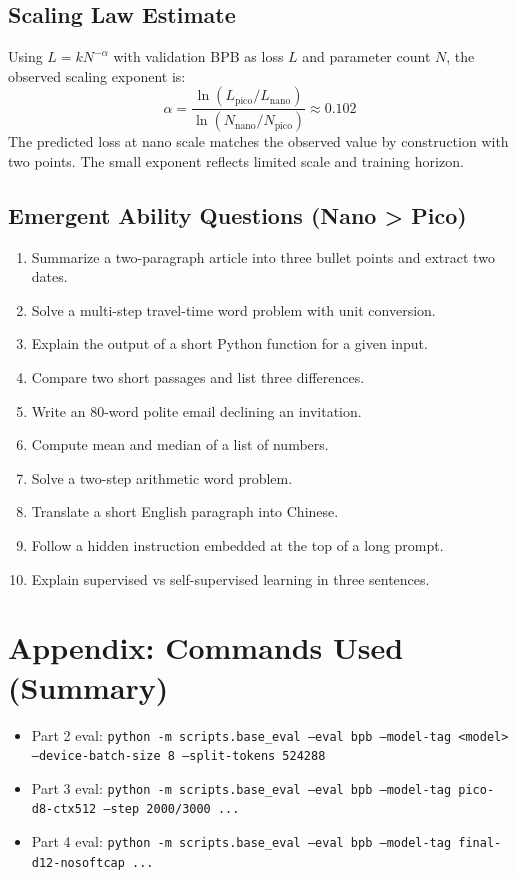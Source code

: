 \documentclass[11pt]{article}
\begin{document}
\subsection*{Scaling Law Estimate}
Using $L = k N^{-\alpha}$ with validation BPB as loss $L$ and parameter count $N$, the observed scaling exponent is:
\[
\alpha = \frac{\ln(L_\text{pico} / L_\text{nano})}{\ln(N_\text{nano} / N_\text{pico})} \approx 0.102
\]
The predicted loss at nano scale matches the observed value by construction with two points. The small exponent reflects limited scale and training horizon.

\subsection*{Emergent Ability Questions (Nano > Pico)}
\begin{enumerate}
\item Summarize a two-paragraph article into three bullet points and extract two dates.
\item Solve a multi-step travel-time word problem with unit conversion.
\item Explain the output of a short Python function for a given input.
\item Compare two short passages and list three differences.
\item Write an 80-word polite email declining an invitation.
\item Compute mean and median of a list of numbers.
\item Solve a two-step arithmetic word problem.
\item Translate a short English paragraph into Chinese.
\item Follow a hidden instruction embedded at the top of a long prompt.
\item Explain supervised vs self-supervised learning in three sentences.
\end{enumerate}

\section*{Appendix: Commands Used (Summary)}
\begin{itemize}
\item Part 2 eval: \texttt{python -m scripts.base\_eval --eval bpb --model-tag <model> --device-batch-size 8 --split-tokens 524288}
\item Part 3 eval: \texttt{python -m scripts.base\_eval --eval bpb --model-tag pico-d8-ctx512 --step 2000/3000 ...}
\item Part 4 eval: \texttt{python -m scripts.base\_eval --eval bpb --model-tag final-d12-nosoftcap ...}
\end{itemize}
\end{document}
